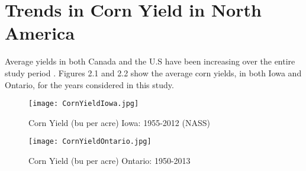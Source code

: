 \section{Trends in Corn Yield in North America}

Average yields in both Canada and the U.S have been increasing over the entire study period \citep{CANy, NASSy}. Figures 2.1 and 2.2 show the average  corn yields, in both Iowa and Ontario, for the years considered in this study.

\begin{figure}[!hb]
  \centering
  \begin{minipage}[b]{0.45\textwidth}
    \texttt{[image: CornYieldIowa.jpg]}
    \caption{Corn Yield (bu per acre) Iowa: 1955-2012 (NASS)}
  \end{minipage}
  \hfill
  \begin{minipage}[b]{0.45\textwidth}
    \texttt{[image: CornYieldOntario.jpg]}
    \caption{Corn Yield (bu per acre) Ontario: 1950-2013 \citep{CANy}}
  \end{minipage}
\end{figure}

